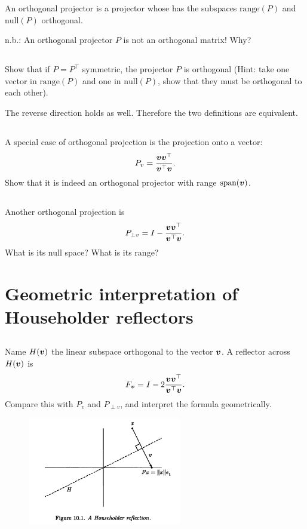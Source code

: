 \documentclass[11pt,letterpaper]{report}
\begin{document}
An orthogonal projector is a projector whose has the subspaces $\text{range}(P)$ and $\text{null}(P)$ orthogonal.

n.b.: An orthogonal projector $P$ is not an orthogonal matrix! Why?

\subsection{}
Show that if $P=P^\top$ symmetric, the projector $P$ is orthogonal (Hint: take one vector in $\text{range}(P)$ and one in $\text{null}(P)$, show that they must be orthogonal to each other). 

The reverse direction holds as well. Therefore the two definitions are equivalent.

\subsection{}
A special case of orthogonal projection is the projection onto a vector:
\begin{align*}
    P_v = \frac{\boldsymbol{v} \boldsymbol{v}^\top}{\boldsymbol{v}^\top \boldsymbol{v}}.
\end{align*}
Show that it is indeed an orthogonal projector with range $\text{span}(\boldsymbol{v})$.

\subsection{}
Another orthogonal projection is
\begin{align*}
    P_{\perp v} = I-\frac{\boldsymbol{v} \boldsymbol{v}^\top}{\boldsymbol{v}^\top \boldsymbol{v}}.
\end{align*}
What is its null space? What is its range?

\section{Geometric interpretation of Householder reflectors}
\subsection{}
Name $H(\boldsymbol{v})$ the linear subspace orthogonal to the vector $\boldsymbol{v}$. A reflector across $H(\boldsymbol{v})$ is 
\begin{align*}
    F_{\boldsymbol{v}} = I - 2 \frac{\boldsymbol{v} \boldsymbol{v}^\top}{\boldsymbol{v}^\top \boldsymbol{v}}.
\end{align*}
Compare this with $P_v$ and $P_{\perp v}$, and interpret the formula geometrically.

\begin{figure}[H]
    \centering
    \includegraphics[width = 0.6\textwidth]{Session_7/latex/figs/TB_HouseholderRef}
\end{figure}
\end{document}
